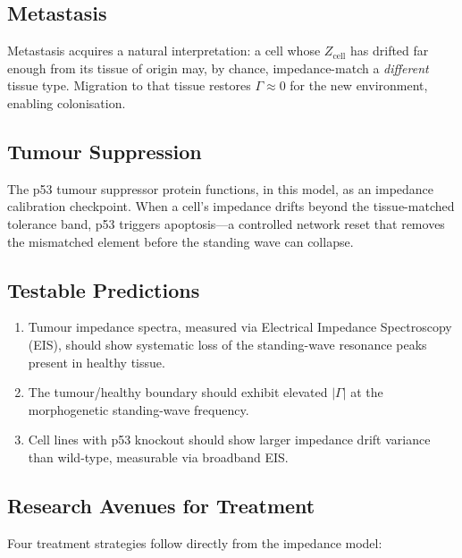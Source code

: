 \subsection{Metastasis}

Metastasis acquires a natural interpretation: a cell whose
$Z_{\mathrm{cell}}$ has drifted far enough from its tissue of
origin may, by chance, impedance-match a \emph{different} tissue
type.  Migration to that tissue restores $\Gamma \approx 0$ for
the new environment, enabling colonisation.

\subsection{Tumour Suppression}

The p53 tumour suppressor protein functions, in this model, as an
impedance calibration checkpoint.  When a cell's impedance drifts
beyond the tissue-matched tolerance band, p53 triggers apoptosis---a
controlled network reset that removes the mismatched element before
the standing wave can collapse.

\subsection{Testable Predictions}

\begin{enumerate}
  \item Tumour impedance spectra, measured via Electrical Impedance
        Spectroscopy (EIS), should show systematic loss of the
        standing-wave resonance peaks present in healthy tissue.
  \item The tumour/healthy boundary should exhibit elevated
        $|\Gamma|$ at the morphogenetic standing-wave frequency.
  \item Cell lines with p53 knockout should show larger impedance
        drift variance than wild-type, measurable via broadband EIS.
\end{enumerate}

\subsection{Research Avenues for Treatment}

Four treatment strategies follow directly from the impedance model:

